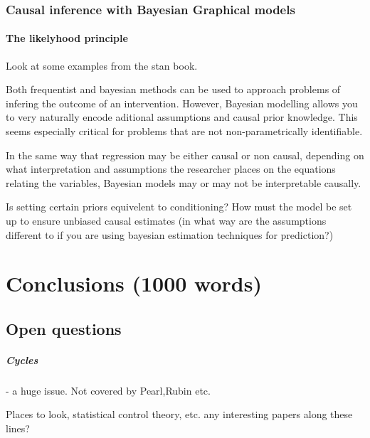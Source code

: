 \documentclass[11pt,a4paper,oneside]{book}
\begin{document}
\subsection*{Causal inference with Bayesian Graphical models}

\subsubsection*{The likelyhood principle}
Look at some examples from the stan book.

Both frequentist and bayesian methods can be used to approach problems of infering the outcome of an intervention. However, Bayesian modelling allows you to very naturally encode aditional assumptions and causal prior knowledge. This seems especially critical for problems that are not non-parametrically identifiable. 

In the same way that regression may be either causal or non causal, depending on what interpretation and assumptions the researcher places on the equations relating the variables, Bayesian models may or may not be interpretable causally.  

Is setting certain priors equivelent to conditioning? How must the model be set up to ensure unbiased causal estimates (in what way are the assumptions different to if you are using bayesian estimation techniques for prediction?)

\chapter*{Conclusions (1000 words)}

\section*{Open questions}
\paragraph{Cycles} - a huge issue. Not covered by Pearl,Rubin etc. 

Places to look, statistical control theory, etc. any interesting papers along these lines?


\end{document}
